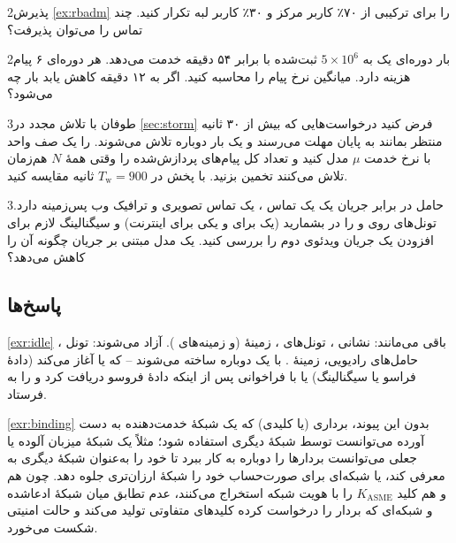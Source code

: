 \documentclass[11pt,a4paper]{article}
\begin{document}
\begin{exercisebox}{2}{پذیرش}\label{exr:rbadm}
\cref{ex:rbadm} را برای ترکیبی از ۷۰٪ کاربر مرکز و ۳۰٪ کاربر لبه تکرار کنید. چند تماس  را می‌توان پذیرفت؟
\end{exercisebox}

\begin{exercisebox}{2}{بار  دوره‌ای}\label{exr:tau}
یک  به $5\times10^6$  ثبت‌شده با  برابر ۵۴ دقیقه خدمت می‌دهد. هر  دوره‌ای ۶ پیام
هزینه دارد. میانگین نرخ پیام را محاسبه کنید. اگر  به ۱۲ دقیقه کاهش یابد بار چه می‌شود؟
\end{exercisebox}

\begin{exercisebox}{3}{طوفان با تلاش مجدد}\label{exr:storm}
در \cref{sec:storm} فرض کنید درخواست‌هایی که بیش از ۳۰ ثانیه منتظر بمانند به پایان مهلت می‌رسند و یک بار دوباره تلاش
می‌شوند.  را یک صف واحد با نرخ خدمت $\mu$ مدل کنید و تعداد کل پیام‌های پردازش‌شده را وقتی همهٔ $N$ 
هم‌زمان تلاش می‌کنند تخمین بزنید. با پخش در $T_\mathrm{w} = 900$ ثانیه مقایسه کنید.
\end{exercisebox}

\begin{exercisebox}{3}{حامل در برابر جریان}\label{exr:flows}
یک  یک تماس ، یک تماس تصویری و ترافیک وب پس‌زمینه دارد. تونل‌های  روی  و
 را در  بشمارید (یک  برای  و یکی برای اینترنت) و سیگنالینگ لازم برای افزودن یک جریان
ویدئوی دوم را بررسی کنید. یک مدل مبتنی بر جریان چگونه آن را کاهش می‌دهد؟
\end{exercisebox}

\subsection*{پاسخ‌ها}

\begin{solutionbox}{\ref{exr:idle}}
باقی می‌مانند: نشانی ، تونل‌های ، زمینهٔ  (و زمینه‌های ). آزاد می‌شوند: تونل
، حامل‌های رادیویی، زمینهٔ . با یک  دوباره ساخته می‌شوند -- که یا  آغاز
می‌کند (دادهٔ فراسو یا سیگنالینگ) یا با فراخوانی پس از اینکه  دادهٔ فروسو دریافت کرد و  را به  فرستاد.
\end{solutionbox}

\begin{solutionbox}{\ref{exr:binding}}
بدون این پیوند، برداری (یا کلیدی) که یک شبکهٔ خدمت‌دهنده به دست آورده می‌توانست توسط شبکهٔ دیگری استفاده شود؛ مثلاً یک
شبکهٔ میزبان آلوده یا جعلی می‌توانست بردارها را دوباره به کار ببرد تا خود را به‌عنوان شبکهٔ دیگری به  معرفی کند،
یا شبکه‌ای برای صورت‌حساب خود را شبکهٔ ارزان‌تری جلوه دهد. چون هم  و هم  کلید $K_{\mathrm{ASME}}$ را با
هویت شبکه استخراج می‌کنند، عدم تطابق میان شبکهٔ ادعاشده و شبکه‌ای که بردار را درخواست کرده کلیدهای متفاوتی تولید می‌کند
و حالت امنیتی شکست می‌خورد.
\end{solutionbox}
\end{document}
